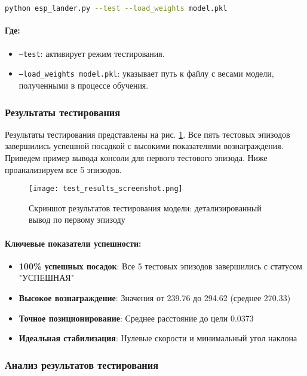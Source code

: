 \documentclass[a4paper,12pt]{article}
\begin{document}
\begin{lstlisting}[language=bash]
	python esp_lander.py --test --load_weights model.pkl
\end{lstlisting}

\paragraph{Где:}
\begin{itemize}
	\item \texttt{--test}: активирует режим тестирования.
	\item \texttt{--load\_weights model.pkl}: указывает путь к файлу с весами модели, полученными в процессе обучения.
\end{itemize}

\subsubsection{Результаты тестирования}

Результаты тестирования представлены на рис. \ref{fig:test_results}.  Все пять тестовых эпизодов завершились успешной посадкой с высокими показателями вознаграждения. Приведем пример вывода консоли для первого тестового эпизода. Ниже проанализируем все 5 эпизодов.

\begin{figure}[H]
	\centering
	\texttt{[image: test\_results\_screenshot.png]}
	\caption{Скриншот результатов тестирования модели: детализированный вывод по первому эпизоду}
	\label{fig:test_results}
\end{figure}

\paragraph{Ключевые показатели успешности:}
\begin{itemize}
	\item \textbf{100\% успешных посадок}: Все 5 тестовых эпизодов завершились с статусом "УСПЕШНАЯ"
	\item \textbf{Высокое вознаграждение}: Значения от 239.76 до 294.62 (среднее 270.33)
	\item \textbf{Точное позиционирование}: Среднее расстояние до цели 0.0373
	\item \textbf{Идеальная стабилизация}: Нулевые скорости и минимальный угол наклона
\end{itemize}

\subsubsection{Анализ результатов тестирования}
\end{document}

